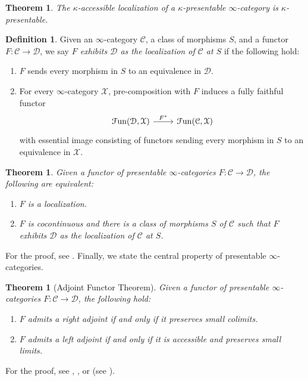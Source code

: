 \documentclass[a4paper]{book}
\newcommand{\lC}{\mathcal{C}}
\newcommand{\lD}{\mathcal{D}}
\newcommand{\lF}{\mathcal{F}}
\newcommand{\lX}{\mathcal{X}}
\newcommand{\Fun}{\lF\mathrm{un}} %
\newtheorem{theorem}[equation]{Theorem}
\theoremstyle{definition}
\newtheorem{definition}[equation]{Definition}
\theoremstyle{remark}
\numberwithin{equation}{section}
\begin{document}
\begin{theorem}\label{thm:locpres}
	The $\kappa$-accessible localization of a $\kappa$-presentable $\infty$-category is $\kappa$-presentable. 
\end{theorem}
\begin{definition}
	Given an $\infty$-category $\lC$, a class of morphisms $S$, and a functor $F:\lC\to\lD$, we say \emph{$F$ exhibits $\lD$ as the localization of $\lC$ at $S$} if the following hold: 
	\begin{enumerate}
		\item $F$ sends every morphism in $S$ to an equivalence in $\lD$.
		\item For every $\infty$-category $\lX$, pre-composition with $F$ induces a fully faithful functor \begin{equation}
			\begin{tikzcd}
				\Fun(\lD,\lX) \arrow[r,"F^*"] & \Fun(\lC,\lX)
			\end{tikzcd}
		\end{equation}with essential image consisting of functors sending every morphism in $S$ to an equivalence in $\lX$. 
	\end{enumerate}
\end{definition}
\begin{theorem}
	Given a functor of presentable $\infty$-categories $F:\lC\to\lD$, the following are equivalent: 
	\begin{enumerate}
		\item $F$ is a localization. 
		\item $F$ is cocontinuous and there is a class of morphisms $S$ of $\lC$ such that $F$ exhibits $\lD$ as the localization of $\lC$ at $S$. 
	\end{enumerate}
\end{theorem}
For the proof, see \cite[Tag 06UW]{kerodon2026}. Finally, we state the central property of presentable $\infty$-categories. 
\begin{theorem}[Adjoint Functor Theorem]
	Given a functor of presentable $\infty$-categories $F:\lC\to\lD$, the following hold: 
	\begin{enumerate}
		\item $F$ admits a right adjoint if and only if it preserves small colimits. 
		\item $F$ admits a left adjoint if and only if it is accessible and preserves small limits. 
	\end{enumerate}
\end{theorem}
For the proof, see \cite[Corollary 5.5.2.9]{lurie2009htt}, \cite[Tag 06Q4]{kerodon2026joyal}, or \cite[Theorem 5.2.14]{land2021introduction} (see \cite[Remark 5.2.16]{land2021introduction}).
\end{document}
